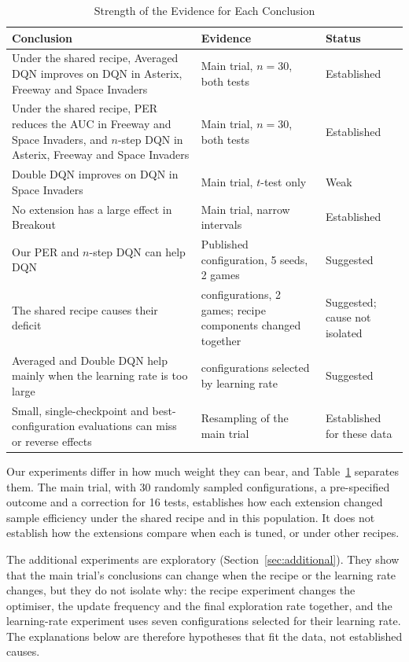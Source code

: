 \documentclass[conference,a4paper]{IEEEtran}
\begin{document}
\begin{table}[t]
\caption{Strength of the Evidence for Each Conclusion}
\label{tab:evidence}
\centering
\footnotesize
\setlength{\tabcolsep}{3pt}
\begin{tabular}{@{}>{\raggedright\arraybackslash}p{}>{\raggedright\arraybackslash}p{}>{\raggedright\arraybackslash}p{}@{}}
\toprule
Conclusion & Evidence & Status \\
\midrule
Under the shared recipe, Averaged DQN improves on DQN in Asterix, Freeway and Space Invaders & Main trial, $n=30$,
both tests & Established \\
Under the shared recipe, PER reduces the AUC in Freeway and Space Invaders, and $n$-step DQN in Asterix, Freeway and
Space Invaders & Main trial, $n=30$, both tests & Established \\
Double DQN improves on DQN in Space Invaders & Main trial, $t$-test only & Weak \\
No extension has a large effect in Breakout & Main trial, narrow intervals & Established \\
Our PER and $n$-step DQN can help DQN & Published configuration, 5 seeds, 2 games & Suggested \\
The shared recipe causes their deficit & 7 configurations, 2 games; recipe components changed together &
Suggested; cause not isolated \\
Averaged and Double DQN help mainly when the learning rate is too large & 7 configurations selected by learning rate
& Suggested \\
Small, single-checkpoint and best-configuration evaluations can miss or reverse effects & Resampling of the main
trial & Established for these data \\
\bottomrule
\end{tabular}
\end{table}

Our experiments differ in how much weight they can bear, and Table~\ref{tab:evidence} separates them. The main trial,
with 30 randomly sampled configurations, a pre-specified outcome and a correction for 16 tests, establishes how each
extension changed sample efficiency under the shared recipe and in this population. It does not establish how the
extensions compare when each is tuned, or under other recipes.

The additional experiments are exploratory (Section~\ref{sec:additional}). They show that the main trial's
conclusions can change when the recipe or the learning rate changes, but they do not isolate why: the recipe experiment changes the optimiser, the update frequency and the final
exploration rate together, and the learning-rate experiment uses seven configurations selected for their learning
rate. The explanations below are therefore hypotheses that fit the data, not established causes.
\end{document}
